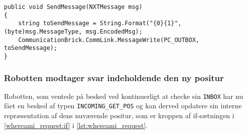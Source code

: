 \begin{lstlisting}[style=csharpsmall,label=lst:sendmessage,caption=SendMessage i NXTPostman]
public void SendMessage(NXTMessage msg)
{
    string toSendMessage = String.Format("{0}{1}", (byte)msg.MessageType, msg.EncodedMsg);
    CommunicationBrick.CommLink.MessageWrite(PC_OUTBOX, toSendMessage);
}
\end{lstlisting}

\subsubsection{Robotten modtager svar indeholdende den ny positur}
Robotten, som ventede på besked ved kontinuerligt at checke sin \lstinline[style=c]!INBOX! har nu fået en besked af typen \lstinline[style=c]!INCOMING_GET_POS! og kan derved opdatere sin interne repræsentation af dens nuværende positur, som er kroppen af if-sætningen i \cref{whereami_request:if} i \cref{lst:whereami_request}.

